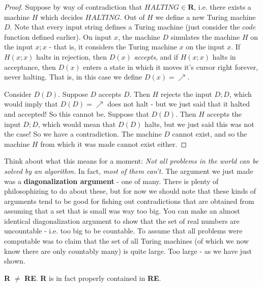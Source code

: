 \begin{proof}
    Suppose by way of contradiction that $HALTING \in \textbf{R}$, i.e. there exists a machine $H$ which decides $HALTING$. Out of $H$ we define a new Turing machine $D$. Note that every input string defines a Turing machine (just consider the $code$ function defined earlier). On input $x$, the machine $D$ simulates the machine $H$ on the input $x;x$ - that is, it considers the Turing machine $x$ on the input $x$. If $H(x;x)$ halts in rejection, then $D(x)$ \textit{accepts}, and if $H(x;x)$ halts in acceptance, then $D(x)$ enters a state in which it moves it's cursor right forever, never halting. That is, in this case we define $D(x) = \nearrow$.
    \par Consider $D(D)$. Suppose $D$ accepts $D$. Then $H$ rejects the input $D;D$, which would imply that $D(D) = \nearrow$ does not halt - but we just said that it halted and accepted! So this cannot be. Suppose that $D(D)$. Then $H$ accepts the input $D;D$, which would mean that $D(D)$ halts, but we just said this was not the case! So we have a contradiction. The machine $D$ cannot exist, and so the machine $H$ from which it was made cannot exist either.
\end{proof}
Think about what this means for a moment: \textit{Not all problems in the world can be solved by an algorithm.} In fact, \textit{most of them can't.} The argument we just made was a \textbf{diagonalization argument} - one of many. There is plenty of philosophizing to do about these, but for now we should note that these kinds of arguments tend to be good for fishing out contradictions that are obtained from assuming that a set that is small was way too big. You can make an almost identical diagonalization argument to show that the set of real numbers are uncountable - i.e. too big to be countable. To assume that all problems were computable was to claim that the set of all Turing machines (of which we now know there are only countably many) is quite large. Too large - as we have just shown.
\begin{corollary}
     \textbf{R} $\neq$ \textbf{RE}. \textbf{R} is in fact properly contained in \textbf{RE}.
\end{corollary}


